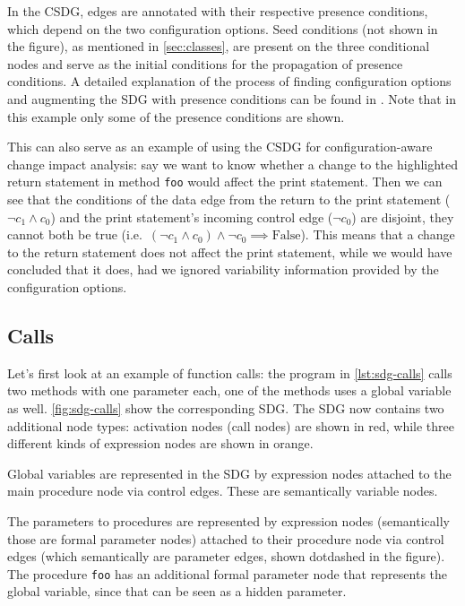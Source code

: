In the CSDG, edges are annotated with their respective presence conditions, which depend on the two configuration 
options. Seed conditions (not shown in the figure), as mentioned in \autoref{sec:classes}, are present on the three 
conditional nodes and serve as the initial conditions for the propagation of presence conditions. A detailed 
explanation of the process of finding configuration options and augmenting the SDG with presence conditions can be 
found in \cite{DBLP:conf/kbse/AngererGPG15}. Note that in this example only some of the presence conditions are shown.

This can also serve as an example of using the CSDG for configuration-aware change impact analysis: say we want to know 
whether a change to the highlighted return statement in method \lstinline|foo| would affect the print statement. Then 
we can see that the conditions of the data edge from the return to the print statement ($ \lnot c_1 \land c_0 $) and 
the print statement's incoming control edge ($ \lnot c_0 $) are disjoint, they cannot both be true
(i.e.\ $ \left( \lnot c_1 \land c_0 \right) \land \lnot c_0 \implies \text{False} $). This means that a change to the 
return statement does not affect the print statement, while we would have concluded that it does, had we ignored 
variability information provided by the configuration options.



\subsection{Calls}

Let's first look at an example of function calls: the program in \autoref{lst:sdg-calls} calls two methods with one 
parameter each, one of the methods uses a global variable as well. \autoref{fig:sdg-calls} show the corresponding SDG. 
The SDG now contains two additional node types: activation nodes (call nodes) are shown in red, while three different 
kinds of expression nodes are shown in orange.

Global variables are represented in the SDG by expression nodes attached to the main procedure node via control edges. 
These are semantically variable nodes.

The parameters to procedures are represented by expression nodes (semantically those are formal parameter nodes) 
attached to their procedure node via control edges (which semantically are parameter edges, shown dotdashed in the 
figure). The procedure \lstinline|foo| has an additional formal parameter node that represents the global variable, 
since that can be seen as a hidden parameter.

